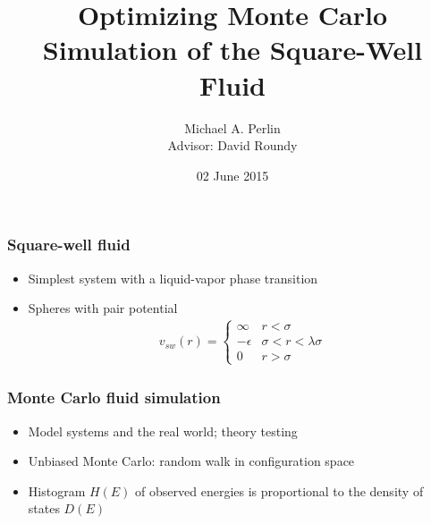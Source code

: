\documentclass[xcolor=dvipsnames]{beamer}
\title[Optimizing MC Simulation of the SW Fluid]
{Optimizing Monte Carlo Simulation of the Square-Well Fluid}
\author[M. A. Perlin, D. Roundy]
{Michael A. Perlin\\Advisor: David Roundy}
\institute{\bf Department of Physics, Oregon State University}
\date{02 June 2015}
\newcommand{\p}[1]{\left(#1\right)} %
\let\olditem\item
\renewcommand{\item}{\setlength{\itemsep}{6pt}\olditem}
\begin{document}
\begin{frame}
  \maketitle
\end{frame}


\begin{frame}
  \frametitle{Square-well fluid}
  \begin{itemize}
  \item Simplest system with a liquid-vapor phase transition
  \item Spheres with pair potential
  \begin{align*}
    v_{sw}\p{r}=\left\{
      \begin{array}{ll}
        \infty & r<\sigma \\
        -\epsilon & \sigma<r<\lambda\sigma \\
        0 & r>\sigma
      \end{array}
    \right.
  \end{align*}
  \end{itemize}
\end{frame}


\begin{frame}
  \frametitle{Monte Carlo fluid simulation}
  \begin{itemize}
  \item Model systems and the real world; theory testing
  \item<2-> Unbiased Monte Carlo: random walk in configuration space
  \item<3> Histogram $H\p{E}$ of observed energies is proportional to
    the density of states $D\p{E}$
  \end{itemize}
\end{frame}
\end{document}
